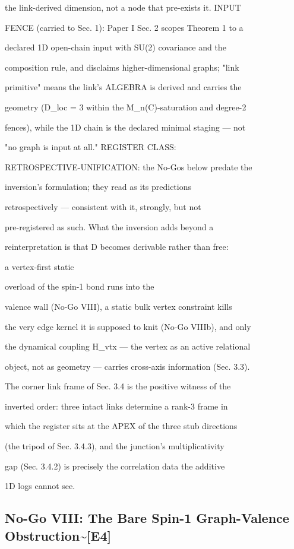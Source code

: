 \documentclass[11pt,a4paper]{article}
\theoremstyle{definition}
\begin{document}
the link-derived dimension, not a node that pre-exists it. INPUT

FENCE (carried to Sec. 1): Paper I Sec. 2 scopes Theorem 1 to a

declared 1D open-chain input with SU(2) covariance and the

composition rule, and disclaims higher-dimensional graphs; "link

primitive" means the link's ALGEBRA is derived and carries the

geometry (D\_loc = 3 within the M\_n(C)-saturation and degree-2

fences), while the 1D chain is the declared minimal staging — not

"no graph is input at all." REGISTER CLASS:

RETROSPECTIVE-UNIFICATION: the No-Gos below predate the

inversion's formulation; they read as its predictions

retrospectively — consistent with it, strongly, but not

pre-registered as such. What the inversion adds beyond a

reinterpretation is that D becomes derivable rather than free:

a vertex-first static

overload of the spin-1 bond runs into the

valence wall (No-Go VIII), a static bulk vertex constraint kills

the very edge kernel it is supposed to knit (No-Go VIIIb), and only

the dynamical coupling H\_vtx — the vertex as an active relational

object, not as geometry — carries cross-axis information (Sec. 3.3).

The corner link frame of Sec. 3.4 is the positive witness of the

inverted order: three intact links determine a rank-3 frame in

which the register sits at the APEX of the three stub directions

(the tripod of Sec. 3.4.3), and the junction's multiplicativity

gap (Sec. 3.4.2) is precisely the correlation data the additive

1D logs cannot see.


\subsection{No-Go VIII: The Bare Spin-1 Graph-Valence Obstruction\textasciitilde{}[\textsc{E4}]}
\end{document}
